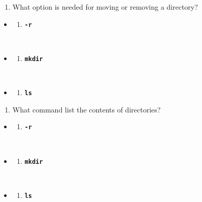 \documentclass[
  letterpaper,
  DIV=11,
  numbers=noendperiod]{scrreprt}
\providecommand{\tightlist}{%
  \setlength{\itemsep}{0pt}\setlength{\parskip}{0pt}}
\begin{document}
\begin{enumerate}
\def\labelenumi{\arabic{enumi}.}
\setcounter{enumi}{3}
\tightlist
\item
  What option is needed for moving or removing a directory?
\end{enumerate}

\begin{itemize}
\tightlist
\item
  \begin{enumerate}
  \def\labelenumi{(\Alph{enumi})}
  \tightlist
  \item
    \textbf{\texttt{-r}}\strut \\
  \end{enumerate}
\item
  \begin{enumerate}
  \def\labelenumi{(\Alph{enumi})}
  \setcounter{enumi}{1}
  \tightlist
  \item
    \textbf{\texttt{mkdir}}\strut \\
  \end{enumerate}
\item
  \begin{enumerate}
  \def\labelenumi{(\Alph{enumi})}
  \setcounter{enumi}{2}
  \tightlist
  \item
    \textbf{\texttt{ls}}
  \end{enumerate}
\end{itemize}

\begin{enumerate}
\def\labelenumi{\arabic{enumi}.}
\setcounter{enumi}{4}
\tightlist
\item
  What command list the contents of directories?
\end{enumerate}

\begin{itemize}
\tightlist
\item
  \begin{enumerate}
  \def\labelenumi{(\Alph{enumi})}
  \tightlist
  \item
    \textbf{\texttt{-r}}\strut \\
  \end{enumerate}
\item
  \begin{enumerate}
  \def\labelenumi{(\Alph{enumi})}
  \setcounter{enumi}{1}
  \tightlist
  \item
    \textbf{\texttt{mkdir}}\strut \\
  \end{enumerate}
\item
  \begin{enumerate}
  \def\labelenumi{(\Alph{enumi})}
  \setcounter{enumi}{2}
  \tightlist
  \item
    \textbf{\texttt{ls}}
  \end{enumerate}
\end{itemize}
\end{document}
